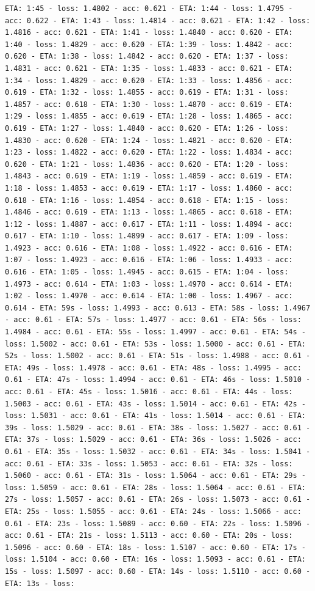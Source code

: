 \documentclass[11pt]{article}
\begin{document}
\begin{Verbatim}[commandchars=\\\{\}]
ETA: 1:45 - loss: 1.4802 - acc: 0.621 - ETA: 1:44 - loss: 1.4795 - acc: 0.622 - ETA: 1:43 - loss: 1.4814 - acc: 0.621 - ETA: 1:42 - loss: 1.4816 - acc: 0.621 - ETA: 1:41 - loss: 1.4840 - acc: 0.620 - ETA: 1:40 - loss: 1.4829 - acc: 0.620 - ETA: 1:39 - loss: 1.4842 - acc: 0.620 - ETA: 1:38 - loss: 1.4842 - acc: 0.620 - ETA: 1:37 - loss: 1.4831 - acc: 0.621 - ETA: 1:35 - loss: 1.4833 - acc: 0.621 - ETA: 1:34 - loss: 1.4829 - acc: 0.620 - ETA: 1:33 - loss: 1.4856 - acc: 0.619 - ETA: 1:32 - loss: 1.4855 - acc: 0.619 - ETA: 1:31 - loss: 1.4857 - acc: 0.618 - ETA: 1:30 - loss: 1.4870 - acc: 0.619 - ETA: 1:29 - loss: 1.4855 - acc: 0.619 - ETA: 1:28 - loss: 1.4865 - acc: 0.619 - ETA: 1:27 - loss: 1.4840 - acc: 0.620 - ETA: 1:26 - loss: 1.4830 - acc: 0.620 - ETA: 1:24 - loss: 1.4821 - acc: 0.620 - ETA: 1:23 - loss: 1.4822 - acc: 0.620 - ETA: 1:22 - loss: 1.4834 - acc: 0.620 - ETA: 1:21 - loss: 1.4836 - acc: 0.620 - ETA: 1:20 - loss: 1.4843 - acc: 0.619 - ETA: 1:19 - loss: 1.4859 - acc: 0.619 - ETA: 1:18 - loss: 1.4853 - acc: 0.619 - ETA: 1:17 - loss: 1.4860 - acc: 0.618 - ETA: 1:16 - loss: 1.4854 - acc: 0.618 - ETA: 1:15 - loss: 1.4846 - acc: 0.619 - ETA: 1:13 - loss: 1.4865 - acc: 0.618 - ETA: 1:12 - loss: 1.4887 - acc: 0.617 - ETA: 1:11 - loss: 1.4894 - acc: 0.617 - ETA: 1:10 - loss: 1.4899 - acc: 0.617 - ETA: 1:09 - loss: 1.4923 - acc: 0.616 - ETA: 1:08 - loss: 1.4922 - acc: 0.616 - ETA: 1:07 - loss: 1.4923 - acc: 0.616 - ETA: 1:06 - loss: 1.4933 - acc: 0.616 - ETA: 1:05 - loss: 1.4945 - acc: 0.615 - ETA: 1:04 - loss: 1.4973 - acc: 0.614 - ETA: 1:03 - loss: 1.4970 - acc: 0.614 - ETA: 1:02 - loss: 1.4970 - acc: 0.614 - ETA: 1:00 - loss: 1.4967 - acc: 0.614 - ETA: 59s - loss: 1.4993 - acc: 0.613 - ETA: 58s - loss: 1.4967 - acc: 0.61 - ETA: 57s - loss: 1.4977 - acc: 0.61 - ETA: 56s - loss: 1.4984 - acc: 0.61 - ETA: 55s - loss: 1.4997 - acc: 0.61 - ETA: 54s - loss: 1.5002 - acc: 0.61 - ETA: 53s - loss: 1.5000 - acc: 0.61 - ETA: 52s - loss: 1.5002 - acc: 0.61 - ETA: 51s - loss: 1.4988 - acc: 0.61 - ETA: 49s - loss: 1.4978 - acc: 0.61 - ETA: 48s - loss: 1.4995 - acc: 0.61 - ETA: 47s - loss: 1.4994 - acc: 0.61 - ETA: 46s - loss: 1.5010 - acc: 0.61 - ETA: 45s - loss: 1.5016 - acc: 0.61 - ETA: 44s - loss: 1.5003 - acc: 0.61 - ETA: 43s - loss: 1.5014 - acc: 0.61 - ETA: 42s - loss: 1.5031 - acc: 0.61 - ETA: 41s - loss: 1.5014 - acc: 0.61 - ETA: 39s - loss: 1.5029 - acc: 0.61 - ETA: 38s - loss: 1.5027 - acc: 0.61 - ETA: 37s - loss: 1.5029 - acc: 0.61 - ETA: 36s - loss: 1.5026 - acc: 0.61 - ETA: 35s - loss: 1.5032 - acc: 0.61 - ETA: 34s - loss: 1.5041 - acc: 0.61 - ETA: 33s - loss: 1.5053 - acc: 0.61 - ETA: 32s - loss: 1.5060 - acc: 0.61 - ETA: 31s - loss: 1.5064 - acc: 0.61 - ETA: 29s - loss: 1.5059 - acc: 0.61 - ETA: 28s - loss: 1.5064 - acc: 0.61 - ETA: 27s - loss: 1.5057 - acc: 0.61 - ETA: 26s - loss: 1.5073 - acc: 0.61 - ETA: 25s - loss: 1.5055 - acc: 0.61 - ETA: 24s - loss: 1.5066 - acc: 0.61 - ETA: 23s - loss: 1.5089 - acc: 0.60 - ETA: 22s - loss: 1.5096 - acc: 0.61 - ETA: 21s - loss: 1.5113 - acc: 0.60 - ETA: 20s - loss: 1.5096 - acc: 0.60 - ETA: 18s - loss: 1.5107 - acc: 0.60 - ETA: 17s - loss: 1.5104 - acc: 0.60 - ETA: 16s - loss: 1.5093 - acc: 0.61 - ETA: 15s - loss: 1.5097 - acc: 0.60 - ETA: 14s - loss: 1.5110 - acc: 0.60 - ETA: 13s - loss: 
\end{Verbatim}
\end{document}
